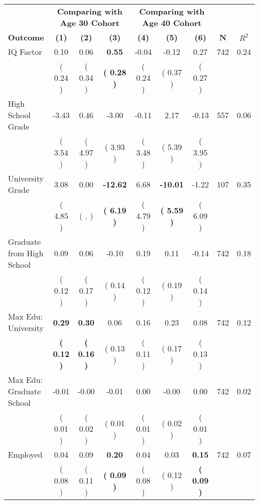 \begin{tabular}{lcccccccc}
\toprule
 & \multicolumn{3}{c}{\textbf{Comparing with Age 30 Cohort}} & \multicolumn{3}{c}{\textbf{Comparing with Age 40 Cohort}} & \\
\cmidrule(lr){2-4} \cmidrule(lr){5-7} 
 \textbf{Outcome} & \textbf{(1)} & \textbf{(2)} & \textbf{(3)} & \textbf{(4)} & \textbf{(5)} & \textbf{(6)} & \textbf{N} & \textbf{$ R^2$} \\
\midrule
IQ Factor &      0.10 &      0.06 & \textbf{     0.55} &     -0.04 &     -0.12 &      0.27 & 742 &       0.24 \\ 
 & (     0.24 ) & (     0.34 ) & \textbf{(     0.28 )} & (     0.24 ) & (     0.37 ) & (     0.27 ) & \\
High School Grade &     -3.43 &      0.46 &     -3.00 &     -0.11 &      2.17 &     -0.13 & 557 &       0.06 \\ 
 & (     3.54 ) & (     4.97 ) & (     3.93 ) & (     3.48 ) & (     5.39 ) & (     3.95 ) & \\
University Grade &      3.08 &      0.00 & \textbf{   -12.62} &      6.68 & \textbf{   -10.01} &     -1.22 & 107 &       0.35 \\ 
 & (     4.85 ) & (        . ) & \textbf{(     6.19 )} & (     4.79 ) & \textbf{(     5.59 )} & (     6.09 ) & \\
Graduate from High School &      0.09 &      0.06 &     -0.10 &      0.19 &      0.11 &     -0.14 & 742 &       0.18 \\ 
 & (     0.12 ) & (     0.17 ) & (     0.14 ) & (     0.12 ) & (     0.19 ) & (     0.14 ) & \\
Max Edu: University & \textbf{     0.29} & \textbf{     0.30} &      0.06 &      0.16 &      0.23 &      0.08 & 742 &       0.12 \\ 
 & \textbf{(     0.12 )} & \textbf{(     0.16 )} & (     0.13 ) & (     0.11 ) & (     0.17 ) & (     0.13 ) & \\
Max Edu: Graduate School &     -0.01 &     -0.00 &     -0.01 &      0.00 &     -0.00 &      0.00 & 742 &       0.02 \\ 
 & (     0.01 ) & (     0.02 ) & (     0.01 ) & (     0.01 ) & (     0.02 ) & (     0.01 ) & \\
Employed &      0.04 &      0.09 & \textbf{     0.20} &      0.04 &      0.03 & \textbf{     0.15} & 742 &       0.07 \\ 
 & (     0.08 ) & (     0.11 ) & \textbf{(     0.09 )} & (     0.08 ) & (     0.12 ) & \textbf{(     0.09 )} & \\

\end{tabular}
